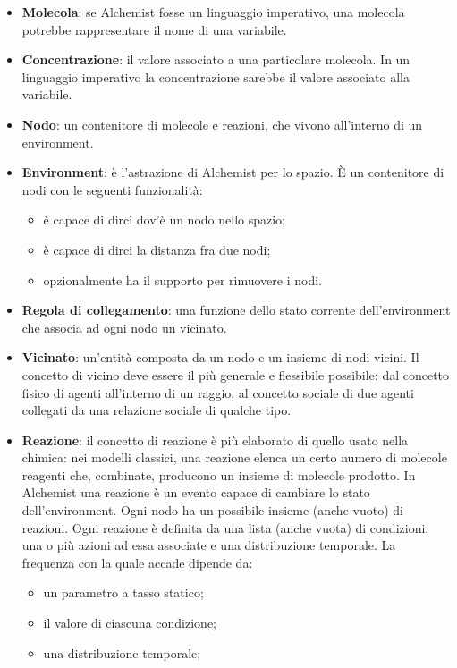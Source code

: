 \documentclass[12pt,a4paper,openright,twoside]{book}
\begin{document}
\begin{itemize}
    \item \textbf{Molecola}: se Alchemist fosse un linguaggio imperativo, una molecola potrebbe rappresentare il nome di una variabile. 
    \item \textbf{Concentrazione}: il valore associato a una particolare molecola. In un linguaggio imperativo la concentrazione sarebbe il valore associato alla variabile. 
    \item \textbf{Nodo}: un contenitore di molecole e reazioni, che vivono all'interno di un environment. 
    \item \textbf{Environment}: è l'astrazione di Alchemist per lo spazio. È un contenitore di nodi con le seguenti funzionalità: 
    \begin{itemize}
        \item è capace di dirci dov'è un nodo nello spazio;
        \item è capace di dirci la distanza fra due nodi;
        \item opzionalmente ha il supporto per rimuovere i nodi.
    \end{itemize}
    \item \textbf{Regola di collegamento}: una funzione dello stato corrente dell'environment che associa ad ogni nodo un vicinato. 
    \item \textbf{Vicinato}: un'entità composta da un nodo e un insieme di nodi vicini. Il concetto di vicino deve essere il più generale e flessibile possibile: dal concetto fisico di agenti all'interno di un raggio, al concetto sociale di due agenti collegati da una relazione sociale di qualche tipo. 
    \item \textbf{Reazione}: il concetto di reazione è più elaborato di quello usato nella chimica: nei modelli classici, una reazione elenca un certo numero di molecole reagenti che, combinate, producono un insieme di molecole prodotto. In Alchemist una reazione è un evento capace di cambiare lo stato dell'environment. Ogni nodo ha un possibile insieme (anche vuoto) di reazioni. Ogni reazione è definita da una lista (anche vuota) di condizioni, una o più azioni ad essa associate e una distribuzione temporale. La frequenza con la quale accade dipende da:
    \begin{itemize}
        \item un parametro a tasso statico; 
        \item il valore di ciascuna condizione; 
        \item una distribuzione temporale;

\end{itemize}
\end{itemize}
\end{document}
